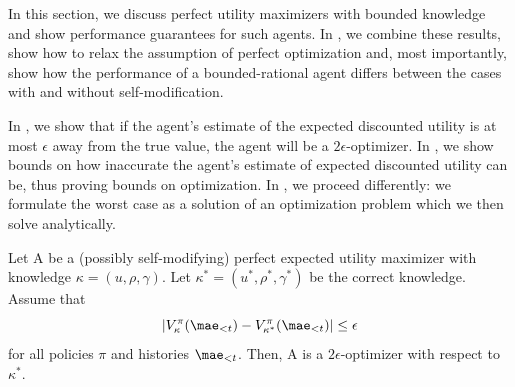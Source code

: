 In this section, we discuss perfect utility maximizers with bounded knowledge and show performance guarantees for such agents. In , we combine these results, show how to relax the assumption of perfect optimization and, most importantly, show how the performance of a bounded-rational agent differs between the cases with and without self-modification.

In , we show that if the agent's estimate of the expected discounted utility is at most $\epsilon$ away from the true value, the agent will be a $2\epsilon$-optimizer. In , we show bounds on how inaccurate the agent's estimate of expected discounted utility can be, thus proving bounds on optimization. In , we proceed differently: we formulate the worst case as a solution of an optimization problem which we then solve analytically.

\begin{lemma} \label{lem:optimization_bound}
Let A be a (possibly self-modifying) perfect expected utility maximizer with knowledge $\kappa = (u,\rho, \gamma)$. Let $\kappa^* = (u^*,\rho^*, \gamma^*)$ be the correct knowledge. Assume that
\begin{equation} \label{eq:bound_assumption}
|V^\pi_\kappa(\mae_{<t}) - V^\pi_{\kappa^*}(\mae_{<t})| \leq \epsilon
\end{equation}
for all policies $\pi$ and histories $\mae_{<t}$. Then, A is a $2\epsilon$-optimizer with respect to $\kappa^*$.
\end{lemma}

